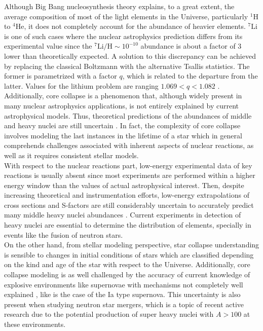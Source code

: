 \documentclass[openany]{book}
\begin{document}
Although Big Bang nucleosynthesis theory explains, to a great extent, the average composition of most of the light elements in the Universe, particularly $\mathrm{{}^{1}H}$ to   $\mathrm{{}^{4}He}$, it does not completely account for the abundance of heavier elements. $\mathrm{{}^{7}Li}$ is one of such cases where the nuclear astrophysics prediction differs from its experimental value since the $\mathrm{{}^{7}Li/H} \sim 10^{-10}$ abundance is about a factor of 3 lower than theoretically expected. A solution to this discrepancy can be achieved by replacing the classical Boltzmann with the alternative Tsallis statistics. The former is parametrized with a factor $q$, which is related to the departure from the latter. Values for the lithium problem are ranging $1.069<q<1.082$  \cite{bertulani_2019}. \\ 

Additionally, core collapse is a phenomenon that, although widely present in many nuclear astrophysics applications, is not entirely explained by current astrophysical models. Thus,  theoretical predictions of the abundances of middle and heavy nuclei are still uncertain \cite{arcones_bardayan_beers_bernstein_blackmon_messer_brown_brown_brune_champagne_et_2017}. In fact, the complexity of core collapse involves modeling the last instances in the lifetime of a star which in general comprehends challenges associated with inherent aspects of nuclear reactions, as well as it requires consistent stellar models. \\

With respect to the nuclear reactions part, low-energy experimental data of key reactions is usually absent since most experiments are performed within a higher energy window than the values of actual astrophysical interest. Then, despite increasing theoretical and instrumentation efforts, low-energy extrapolations of cross sections and S-factors are still considerably uncertain to accurately predict many middle heavy nuclei abundances \cite{carlson_carpenter_casten_elster_fallon_gade_gross_hagen_hayes_higinbotham_et_2017}. Current experiments in detection of heavy nuclei are essential to determine the distribution of elements, specially in events like the fusion of neutron stars. \\ 


On the other hand, from stellar modeling perspective, star collapse understanding is sensible to changes in initial conditions of stars which are classified depending on the kind and age of the star with respect to the Universe. Additionally, core collapse modeling is as well challenged by the accuracy of current knowledge of explosive environments like supernovae with mechanisms not completely well explained \cite{bertulani_kajino_2016}, like is the case of the Ia type supernova. This uncertainty is also present when studying neutron star mergers, which is a topic of recent active research due to the potential production of super heavy nuclei with $A > 100$ at these environments.  \\
\end{document}
